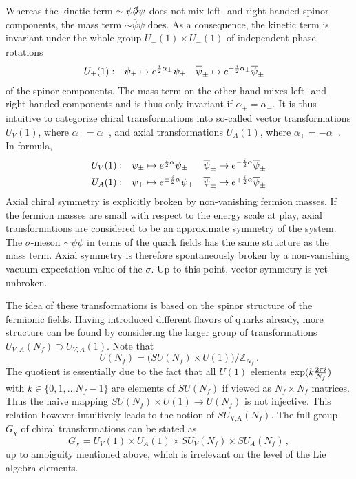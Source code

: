 Whereas the kinetic term ${\sim\psi\slashed{\partial}\psi}$ does not mix left- and right-handed spinor components, the mass term ${\sim\overline{\psi}\psi}$ does. As a consequence, the kinetic term is invariant under the whole group ${U_+(1)\times U_-(1)}$ of independent phase rotations
\begin{align}
        &&U_\pm(1)  :&& \psi_\pm&\mapsto e^{\frac{{i}}{2}\alpha_\pm}\psi_\pm&\overline{\psi}_\pm&\mapsto e^{-\frac{{i}}{2}\alpha_\pm}\overline{\psi}_\pm&&
\end{align}
of the spinor components. The mass term on the other hand mixes left- and right-handed components and is thus only invariant if ${\alpha_+=\alpha_-}$. It is thus intuitive to categorize chiral transformations into so-called vector transformations ${U_V(1)}$, where ${\alpha_+=\alpha_-}$, and axial transformations ${U_A(1)}$, where ${\alpha_+=-\alpha_-}$. In formula,
\begin{subequations}
    \begin{align}
        &&U_V(1) : & &\psi_\pm&\mapsto e^{\frac{{i}}{2}\alpha}\psi_\pm &\overline{\psi}_\pm&\to e^{-\frac{{i}}{2}\alpha}\overline{\psi}_\pm      &&\\
        &&U_A(1) : & &\psi_\pm&\mapsto e^{\pm\frac{{i}}{2}\alpha}\psi_\pm &\overline{\psi}_\pm&\mapsto e^{\mp\frac{{i}}{2}\alpha}\overline{\psi}_\pm&&
    \end{align}
\end{subequations}
Axial chiral symmetry is explicitly broken by non-vanishing fermion masses. If the fermion masses are small with respect to the energy scale at play, axial transformations are considered to be an approximate symmetry of the system. The $\sigma$-meson ${\sim\overline{\psi}\psi}$ in terms of the quark fields has the same structure as the mass term. Axial symmetry is therefore spontaneously broken by a non-vanishing vacuum expectation value of the $\sigma$. Up to this point, vector symmetry is yet unbroken.

The idea of these transformations is based on the spinor structure of the fermionic fields. Having introduced different flavors of quarks already, more structure can be found by considering the larger group of transformations ${U_{V,A}(N_f)\supset U_{V,A}(1)}$. Note that
\begin{equation}
    U(N_f)=\big(SU(N_f)\times U(1)\big)/\mathbb{Z}_{N_f}\,.
\end{equation}
The quotient is essentially due to the fact that all ${U(1)}$ elements ${\exp(k\frac{2\pi{i}}{N_f})}$ with ${k\in\{0,1,\dots N_f-1\}}$ are elements of ${SU(N_f)}$ if viewed as ${N_f\times N_f}$ matrices. Thus the naive mapping ${SU(N_f)\times U(1)\to U(N_f)}$ is not injective. This relation however intuitively leads to the notion of ${SU_\text{V,A}(N_f)}$. The full group ${G_\chi}$ of chiral transformations can be stated as
\begin{equation}
    G_\chi=U_V(1)\times U_A(1)\times SU_V(N_f)\times SU_A(N_f)\,,
\end{equation}
up to ambiguity mentioned above, which is irrelevant on the level of the Lie algebra elements.

